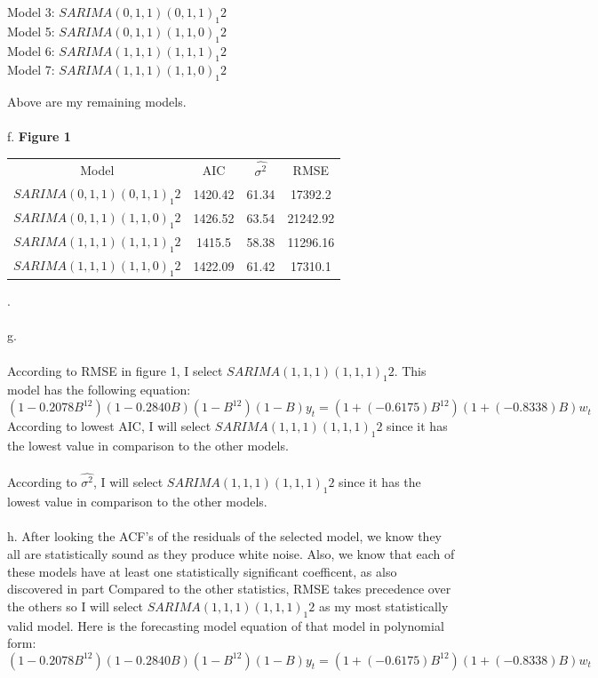 \documentclass[11pt]{article}
\begin{document}
\begin{center}
Model 3: $SARIMA(0,1,1)(0,1,1)_1 2$ \\
Model 5: $SARIMA(0,1,1)(1,1,0)_1 2$ \\
Model 6: $SARIMA(1,1,1)(1,1,1)_1 2$ \\
Model 7: $SARIMA(1,1,1)(1,1,0)_1 2$ 
\end{center}
Above are my remaining models.
\\\\
f.
\textbf{Figure 1}
\begin{table}[h]
\centering
\begin{tabular}{cccc}
Model   & AIC     & $\hat{\sigma^2}$ & RMSE     \\
$SARIMA(0,1,1)(0,1,1)_1 2$ & 1420.42 & 61.34                              & 17392.2  \\
$SARIMA(0,1,1)(1,1,0)_1 2$ & 1426.52 & 63.54                              & 21242.92 \\
$SARIMA(1,1,1)(1,1,1)_1 2$ & 1415.5 & 58.38
& 11296.16 \\
$SARIMA(1,1,1)(1,1,0)_1 2$ & 1422.09 & 61.42                              & 17310.1 
\end{tabular}
\end{table}
.
\\\\
g.
\\\\
According to RMSE in figure 1, I select $SARIMA(1,1,1)(1,1,1)_1 2$. This model has the following equation:
$$ (1 - 0.2078 B^{12})(1 - 0.2840 B)(1 - B^{12})(1 - B)y_t = (1 + (-0.6175)B^{12})(1 + (-0.8338)B)w_t $$
According to lowest AIC, I will select $SARIMA(1,1,1)(1,1,1)_1 2$ since it has the lowest value in comparison to the other models.
\\\\
According to $\hat{\sigma^2}$, I will select $SARIMA(1,1,1)(1,1,1)_1 2$ since it has the lowest value in comparison to the other models.
\\\\
h. After looking the ACF's of the residuals of the selected model, we know they all are statistically sound as they produce white noise. Also, we know that each of these models have at least one statistically significant coefficent, as also discovered in part Compared to the other statistics, RMSE takes precedence over the others so I will select $SARIMA(1,1,1)(1,1,1)_1 2$ as my most statistically valid model. Here is the forecasting model equation of that model in polynomial form:
$$ (1 - 0.2078 B^{12})(1 - 0.2840 B)(1 - B^{12})(1 - B)y_t = (1 + (-0.6175)B^{12})(1 + (-0.8338)B)w_t $$
\end{document}
